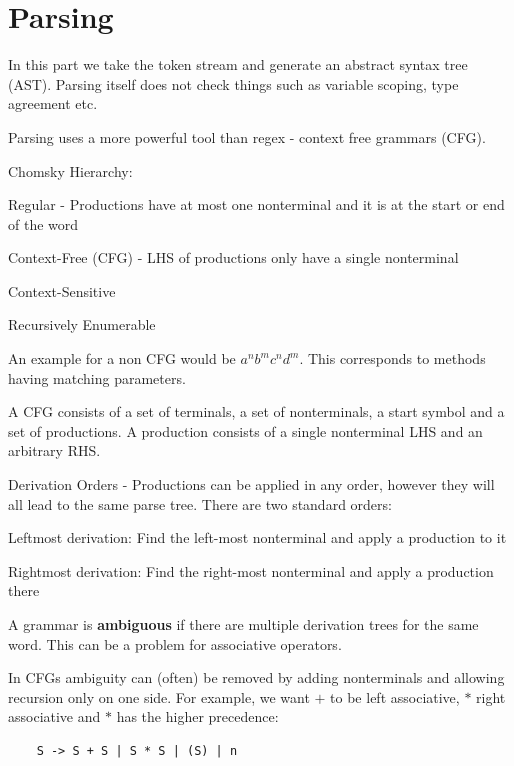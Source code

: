\section*{Parsing}

In this part we take the token stream and generate an abstract syntax tree (AST). Parsing itself does not check things such as variable scoping, type agreement etc. \medskip

Parsing uses a more powerful tool than regex - context free grammars (CFG). \medskip

Chomsky Hierarchy:
\begin{compactitem}[$\quad\bullet$]
	\item Regular - Productions have at most one nonterminal and it is at the start or end of the word
	\item Context-Free (CFG) - LHS of productions only have a single nonterminal
	\item Context-Sensitive
	\item Recursively Enumerable
\end{compactitem}

An example for a non CFG would be $a^n b^m c^n d^m$. This corresponds to methods having matching parameters.\medskip

A CFG consists of a set of terminals, a set of nonterminals, a start symbol and a set of productions. A production consists of a single nonterminal LHS and an arbitrary RHS. \medskip

Derivation Orders - Productions can be applied in any order, however they will all lead to the same parse tree. There are two standard orders:
\begin{compactitem}[$\quad\bullet$]
	\item Leftmost derivation: Find the left-most nonterminal and apply a production to it
	\item Rightmost derivation: Find the right-most nonterminal and apply a production there
\end{compactitem}

A grammar is \textbf{ambiguous} if there are multiple derivation trees for the same word. This can be a problem for associative operators. \medskip

In CFGs ambiguity can (often) be removed by adding nonterminals and allowing recursion only on one side. For example, we want $+$ to be left associative, $*$ right associative and $*$ has the higher precedence:\smallskip

\begin{lstlisting}
	S -> S + S | S * S | (S) | n
\end{lstlisting} \smallskip

